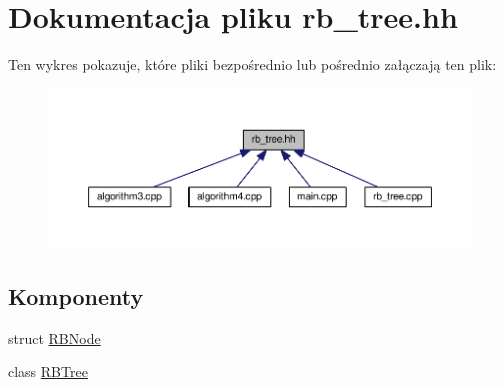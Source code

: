 \hypertarget{rb__tree_8hh}{\section{Dokumentacja pliku rb\-\_\-tree.\-hh}
\label{rb__tree_8hh}
}
Ten wykres pokazuje, które pliki bezpośrednio lub pośrednio załączają ten plik\-:\nopagebreak
\begin{figure}[H]
\begin{center}
\leavevmode
\includegraphics[width=350pt]{rb__tree_8hh__dep__incl}
\end{center}
\end{figure}
\subsection*{Komponenty}
\begin{DoxyCompactItemize}
\item 
struct \hyperlink{struct_r_b_node}{R\-B\-Node}
\item 
class \hyperlink{class_r_b_tree}{R\-B\-Tree}
\end{DoxyCompactItemize}
